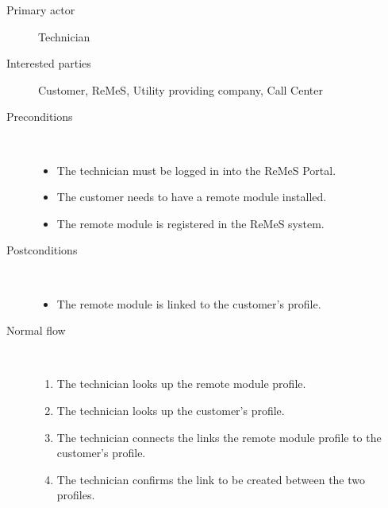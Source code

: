 \begin{description}
	\item[Primary actor] Technician
	\item[Interested parties] Customer, ReMeS, Utility providing company, Call
	Center
	\item[Preconditions] \  
	\begin{itemize}
		\item The technician must be logged in into the ReMeS Portal.
		\item The customer needs to have a remote module installed.
		\item The remote module is registered in the ReMeS system.
	\end{itemize}
	\item[Postconditions] \ 
	\begin{itemize}
		\item The remote module is linked to the customer's profile.
	\end{itemize}
	\item[Normal flow] \ 
	\begin{enumerate}
	  	\item The technician looks up the remote module profile.
	  	\item The technician looks up the customer's profile.
	  	\item The technician connects the links the remote module profile to the
	  	customer's profile.
	  	\item The technician confirms the link to be created between the two
	  	profiles.
	\end{enumerate}
\end{description}